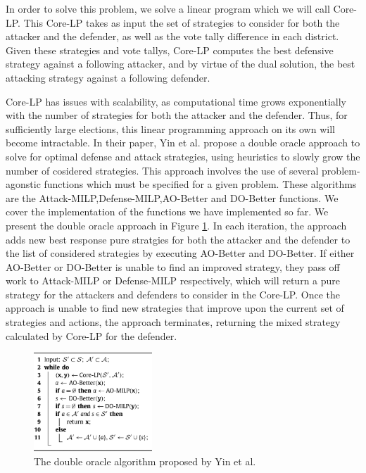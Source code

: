 \documentclass[letterpaper]{article} %
\begin{document}
In order to solve this problem, we solve a linear program which we will call Core-LP. This Core-LP takes as input the set of strategies to consider for both the attacker and the defender, as well as the vote tally difference in each district. Given these strategies and vote tallys, Core-LP computes the best defensive strategy against a following attacker, and by virtue of the dual solution, the best attacking strategy against a following defender. 

Core-LP has issues with scalability, as computational time grows exponentially with the number of strategies for both the attacker and the defender. Thus, for sufficiently large elections, this linear programming approach on its own will become intractable. In their paper, Yin et al. propose a double oracle approach to solve for optimal defense and attack strategies, using heuristics to slowly grow the number of cosidered strategies. This approach involves the use of several problem-agonstic functions which must be specified for a given problem. These algorithms are the Attack-MILP,Defense-MILP,AO-Better and DO-Better functions. We cover the implementation of the functions we have implemented so far. We present the double oracle approach in Figure \ref{fig:doubleoracle}. In each iteration, the approach adds new best response pure stratgies for both the attacker and the defender to the list of considered strategies by executing AO-Better and DO-Better. If either AO-Better or DO-Better is unable to find an improved strategy, they pass off work to Attack-MILP or Defense-MILP respectively, which will return a pure strategy for the attackers and defenders to consider in the Core-LP. Once the approach is unable to find new strategies that improve upon the current set of strategies and actions, the approach terminates, returning the mixed strategy calculated by Core-LP for the defender. 

\begin{figure}[!h]
  \centering
  \includegraphics[height=10em]{doubleoracle.jpg}
  \caption{The double oracle algorithm proposed by Yin et al.}
  \label{fig:doubleoracle}
\end{figure}
\end{document}
